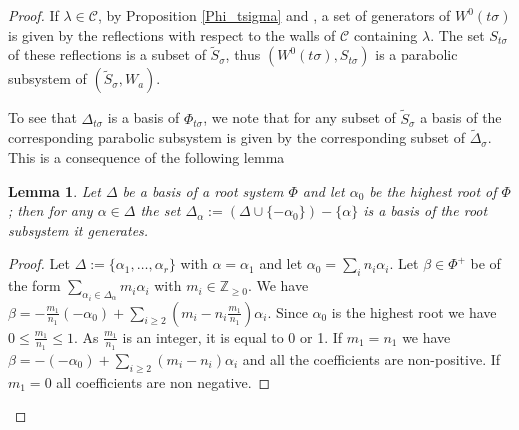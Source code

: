 \documentclass{amsart}
\newtheorem{lemma}[equation]{Lemma}
\numberwithin{equation}{section}
\theoremstyle{definition}
\theoremstyle{remark}
\newcommand\BZ{{\mathbb Z}}
\newcommand\CC{{\mathcal C}}
\newcommand\Wa{W_a}
\begin{document}
\begin{proof}
If $\lambda\in\CC$,
by Proposition \ref{Phi_tsigma} and
\cite[Chap. V \S3 no 3, (vii) of Proposition 1]{Bou}, a set of
generators of $W^0(t\sigma)$  is given by the reflections with respect to
the walls of $\CC$ containing $\lambda$. The set $S_{t\sigma}$ of these 
reflections is a subset of $\tilde S_\sigma$, thus
$(W^0(t\sigma),S_{t\sigma})$ is a parabolic subsystem of $(\tilde
S_\sigma,\Wa)$.

To see that $\Delta_{t\sigma}$ is a basis of
$\Phi_{t\sigma}$, we note that for any subset of $\tilde S_\sigma$
a basis of the corresponding parabolic subsystem is given by the corresponding
subset of $\tilde\Delta_\sigma$.
This is a consequence of 
the following lemma
\begin{lemma}
Let  $\Delta$ be a basis  of a root system  $\Phi$ and let $\alpha_0$ be the
highest   root  of   $\Phi$;  then   for  any   $\alpha\in\Delta$  the  set
$\Delta_\alpha:=(\Delta\cup\{-\alpha_0\})-\{\alpha\}$  is  a  basis  of  the
root subsystem it generates.
\end{lemma}
\begin{proof}Let  $\Delta:=\{\alpha_1,\ldots,\alpha_r\}$  with
$\alpha=\alpha_1$ and let $\alpha_0=\sum_i n_i\alpha_i$.
Let   $\beta\in\Phi^+$   be  of the form
$\sum_{\alpha_i\in\Delta_\alpha}m_i\alpha_i$ with $m_i\in\BZ_{\ge 0}$. 
We have
$\beta=-\frac{m_1}{n_1}(-\alpha_0)+\sum_{i\geq2}(m_i-n_i\frac{m_1}{n_1})\alpha_i$.
Since  $\alpha_0$ is the highest root we have $0\leq\frac{m_1}{n_1}\leq 1$.
As  $\frac{m_1}{n_1}$ is an integer, it is equal to 0 or 1. If $m_1=n_1$ we
have   $\beta=-(-\alpha_0)+\sum_{i\geq2}(m_i-n_i)\alpha_i$   and   all  the
coefficients  are  non-positive.  If  $m_1=0$  all  coefficients  are  non
negative.
\end{proof}
\end{proof}
\end{document}
